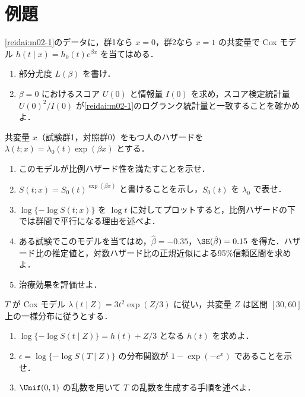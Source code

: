 \section{例題}\label{sec:m03-reidai}
\begin{reidai}\label{reidai:m03-1}
\cref{reidai:m02-1}のデータに，群1なら $x=0$，群2なら $x=1$ の共変量で Cox モデル $h(t\mid x)=h_0(t)e^{\beta x}$ を当てはめる．
\begin{enumerate}[label=〔\arabic*〕]
\item 部分尤度 $L(\beta)$ を書け．
\item $\beta=0$ におけるスコア $U(0)$ と情報量 $I(0)$ を求め，スコア検定統計量 $U(0)^2/I(0)$ が\cref{reidai:m02-1}のログランク統計量と一致することを確かめよ．
\end{enumerate}
\end{reidai}

\begin{reidai}\label{reidai:m03-2}
共変量 $x$（試験群1，対照群0）をもつ人のハザードを $\lambda(t;x)=\lambda_0(t)\exp(\beta x)$ とする．
\begin{enumerate}[label=〔\arabic*〕]
\item このモデルが比例ハザード性を満たすことを示せ．
\item $S(t;x)=S_0(t)^{\exp(\beta x)}$ と書けることを示し，$S_0(t)$ を $\lambda_0$ で表せ．
\item $\log\{-\log S(t;x)\}$ を $\log t$ に対してプロットすると，比例ハザードの下では群間で平行になる理由を述べよ．
\item ある試験でこのモデルを当てはめ，$\hat\beta=-0.35$，$\SE(\hat\beta)=0.15$ を得た．ハザード比の推定値と，対数ハザード比の正規近似による95\%信頼区間を求めよ．
\item 治療効果を評価せよ．
\end{enumerate}
\end{reidai}

\begin{reidai}\label{reidai:m03-3}
$T$ が Cox モデル $\lambda(t\mid Z)=3t^2\exp(Z/3)$ に従い，共変量 $Z$ は区間 $[30,60]$ 上の一様分布に従うとする．
\begin{enumerate}[label=〔\arabic*〕]
\item $\log\{-\log S(t\mid Z)\}=h(t)+Z/3$ となる $h(t)$ を求めよ．
\item $\epsilon=\log\{-\log S(T\mid Z)\}$ の分布関数が $1-\exp(-e^x)$ であることを示せ．
\item $\Unif(0,1)$ の乱数を用いて $T$ の乱数を生成する手順を述べよ．
\end{enumerate}
\end{reidai}

